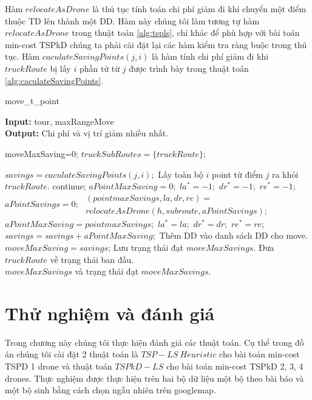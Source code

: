 \documentclass[a4paper,12pt]{report}
\begin{document}
Hàm $relocateAsDrone$ là thủ tục tính toán chi phí giảm đi khi chuyển một điểm thuộc \ac{TD} lên thành một \ac{DD}. Hàm này chúng tôi làm tương tự hàm $relocateAsDrone$ trong thuật toán \ref{alg:tspls}, chỉ khác để phù hợp với bài toán min-cost \ac{TSPkD} chúng ta phải cài đặt lại các hàm kiểm tra ràng buộc trong thủ tục. Hàm $caculateSavingPoints(j,i)$ là hàm tính chi phí giảm đi khi $truckRoute$ bị lấy $i$ phần tử từ $j$ được trình bày trong thuật toán \ref{alg:caculateSavingPoints}.
\begin{algorithm}[H]

\caption{move\_t\_point}
\textbf{Input:} tour, maxRangeMove\\
\textbf{Output:} Chi phí và vị trí giảm nhiều nhất.

\begin{algorithmic}[1]
\State moveMaxSaving=0;
\State $truckSubRoutes = \{truckRoute\};$

\State $savings=caculateSavingPoints(j,i);$
\State Lấy toàn bộ $i$ point từ điểm $j$ ra khỏi $truckRoute$.
\State continue;
\EndIf
{}
\State $aPointMaxSaving=0;$
\State $la^*=-1;$
\State $dr^*=-1;$
\State $re^*=-1;$
\State $aPointSavings=0;$
\State $\begin{array}{l}

(pointmaxSavings,la,dr,re)= \\ relocateAsDrone(h,subroute,aPointSavings);\end{array}$
\State $aPointMaxSaving=pointmaxSavings;$
\State $la^*=la;$
\State $dr^*=dr;$
\State $re^*=re;$
\EndIf
\EndFor	
\State $savings=savings+aPointMaxSaving;$
\State Thêm \ac{DD} vào danh sách \ac{DD} cho move.
\EndFor
\State $moveMaxSaving=savings$;
\State Lưu trạng thái đạt $moveMaxSavings$.
\EndIf
\State Đưa $truckRoute$ về trạng thái ban đầu.
\EndFor
\EndFor\\
\Return $moveMaxSavings$ và trạng thái đạt $moveMaxSavings$.
\end{algorithmic}
\label{alg:kpointmove}
\end{algorithm}

\chapter{Thử nghiệm và đánh giá}
Trong chương này chúng tôi thực hiện đánh giá các thuật toán. Cụ thể trong đồ án chúng tôi cài đặt 2 thuật toán là $TSP-LS \ Heuristic$ cho bài toán min-cost TSPD 1 drone và thuật toán $TSPkD-LS$ cho bài toán min-cost TSPkD 2, 3, 4 drones. Thực nghiệm được thực hiện trên  hai bộ dữ liệu một bộ theo bài báo \cite{main} và một bộ sinh bằng cách chọn ngẫu nhiên trên googlemap. 
\end{document}
